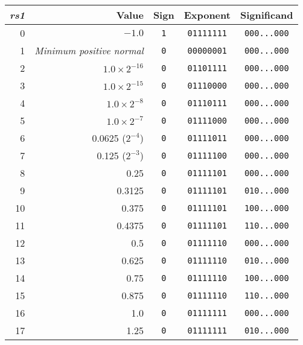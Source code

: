 \begin{table}[h]
\center
\begin{tabular}{|r|r|c|c|c|}
\hline
{\em rs1}   & Value                            & Sign    & Exponent       & Significand     \\
\hline
 0          & $-1.0$                           & {\tt 1} & {\tt 01111111} & {\tt 000...000} \\
 1          & {\em Minimum positive normal}    & {\tt 0} & {\tt 00000001} & {\tt 000...000} \\
 2          & $1.0 \times 2^{-16}$             & {\tt 0} & {\tt 01101111} & {\tt 000...000} \\
 3          & $1.0 \times 2^{-15}$             & {\tt 0} & {\tt 01110000} & {\tt 000...000} \\
 4          & $1.0 \times 2^{-8}$              & {\tt 0} & {\tt 01110111} & {\tt 000...000} \\
 5          & $1.0 \times 2^{-7}$              & {\tt 0} & {\tt 01111000} & {\tt 000...000} \\
 6          & 0.0625 ($2^{-4}$)                & {\tt 0} & {\tt 01111011} & {\tt 000...000} \\
 7          & 0.125 ($2^{-3}$)                 & {\tt 0} & {\tt 01111100} & {\tt 000...000} \\
 8          & 0.25                             & {\tt 0} & {\tt 01111101} & {\tt 000...000} \\
 9          & 0.3125                           & {\tt 0} & {\tt 01111101} & {\tt 010...000} \\
10          & 0.375                            & {\tt 0} & {\tt 01111101} & {\tt 100...000} \\
11          & 0.4375                           & {\tt 0} & {\tt 01111101} & {\tt 110...000} \\
12          & 0.5                              & {\tt 0} & {\tt 01111110} & {\tt 000...000} \\
13          & 0.625                            & {\tt 0} & {\tt 01111110} & {\tt 010...000} \\
14          & 0.75                             & {\tt 0} & {\tt 01111110} & {\tt 100...000} \\
15          & 0.875                            & {\tt 0} & {\tt 01111110} & {\tt 110...000} \\
16          & 1.0                              & {\tt 0} & {\tt 01111111} & {\tt 000...000} \\
17          & 1.25                             & {\tt 0} & {\tt 01111111} & {\tt 010...000} \\

\end{tabular}
\end{table}
